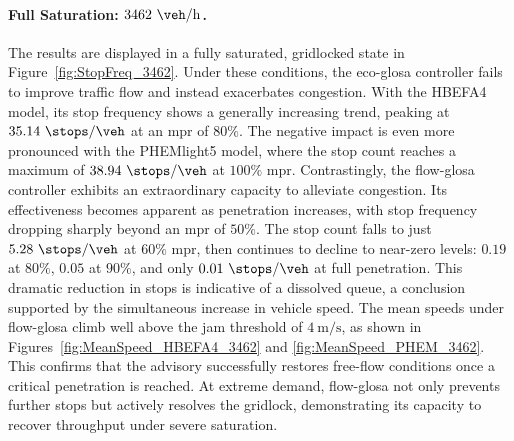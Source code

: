 \paragraph{Full Saturation: $3462~\unit{\veh\per\hour}$.}
The results are displayed in a fully saturated, gridlocked state in Figure~\vref{fig:StopFreq_3462}. Under these conditions, the \ac{eco-glosa} controller fails to improve traffic flow and instead exacerbates congestion. With the HBEFA4 model, its stop frequency shows a generally increasing trend, peaking at $35.14~\unit{\stops\per\veh}$ at an \ac{mpr} of $80\%$. The negative impact is even more pronounced with the PHEMlight5 model, where the stop count reaches a maximum of $38.94~\unit{\stops\per\veh}$ at $100\%$ \ac{mpr}.
\mynewline
Contrastingly, the \ac{flow-glosa} controller exhibits an extraordinary capacity to alleviate congestion. Its effectiveness becomes apparent as penetration increases, with stop frequency dropping sharply beyond an \ac{mpr} of $50\%$. The stop count falls to just $5.28~\unit{\stops\per\veh}$ at $60\%$ \ac{mpr}, then continues to decline to near-zero levels: $0.19$ at $80\%$, $0.05$ at $90\%$, and only $0.01~\unit{\stops\per\veh}$ at full penetration.
\mynewline
This dramatic reduction in stops is indicative of a dissolved queue, a conclusion supported by the simultaneous increase in vehicle speed. The mean speeds under \ac{flow-glosa} climb well above the jam threshold of $4~\unit{\metre\per\second}$, as shown in Figures~\vref{fig:MeanSpeed_HBEFA4_3462} and \vref{fig:MeanSpeed_PHEM_3462}. This confirms that the advisory successfully restores free-flow conditions once a critical penetration is reached. At extreme demand, \ac{flow-glosa} not only prevents further stops but actively resolves the gridlock, demonstrating its capacity to recover throughput under severe saturation.


